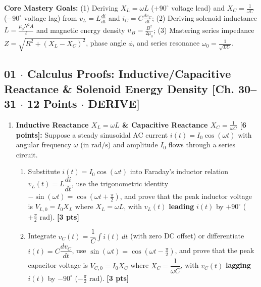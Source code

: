 \documentclass[10pt,letterpaper]{article}
\begin{document}
{{{  \textbf{Core Mastery Goals:} (1) Deriving $X_L = \omega L$ ($+90^\circ$ voltage lead) and $X_C = \frac{1}{\omega C}$ ($-90^\circ$ voltage lag) from $v_L = L\frac{di}{dt}$ and $i_C = C\frac{dv_C}{dt}$; (2) Deriving solenoid inductance $L = \frac{\mu_0 N^2 A}{\ell}$ and magnetic energy density $u_B = \frac{B^2}{2\mu_0}$; (3) Mastering series impedance $Z = \sqrt{R^2 + (X_L - X_C)^2}$, phase angle $\phi$, and series resonance $\omega_0 = \frac{1}{\sqrt{LC}}$.


\subsection*{01 $\cdot$ Calculus Proofs: Inductive/Capacitive Reactance \& Solenoid Energy Density \hfill [Ch. 30--31 $\cdot$ 12 Points $\cdot$ DERIVE]}

\begin{enumerate}
  \item \textbf{Inductive Reactance $X_L = \omega L$ \& Capacitive Reactance $X_C = \frac{1}{\omega C}$ [6 points]:} Suppose a steady sinusoidal AC current $i(t) = I_0 \cos(\omega t)$ with angular frequency $\omega$ (in $\text{rad/s}$) and amplitude $I_0$ flows through a series circuit.
    \begin{enumerate}
      \item Substitute $i(t) = I_0\cos(\omega t)$ into Faraday's inductor relation $v_L(t) = L\dfrac{di}{dt}$, use the trigonometric identity $-\sin(\omega t) = \cos(\omega t + \frac{\pi}{2})$, and prove that the peak inductor voltage is $V_{L,0} = I_0 X_L$ where $X_L = \omega L$, with $v_L(t)$ \textbf{leading} $i(t)$ by $+90^\circ$ ($+\frac{\pi}{2}\text{ rad}$). \textbf{[3 pts]}
      \item Integrate $v_C(t) = \dfrac{1}{C}\int i(t)\,dt$ (with zero DC offset) or differentiate $i(t) = C\dfrac{dv_C}{dt}$, use $\sin(\omega t) = \cos(\omega t - \frac{\pi}{2})$, and prove that the peak capacitor voltage is $V_{C,0} = I_0 X_C$ where $X_C = \dfrac{1}{\omega C}$, with $v_C(t)$ \textbf{lagging} $i(t)$ by $-90^\circ$ ($-\frac{\pi}{2}\text{ rad}$). \textbf{[3 pts]}
    \end{enumerate}
  

\end{enumerate}}}}
\end{document}
